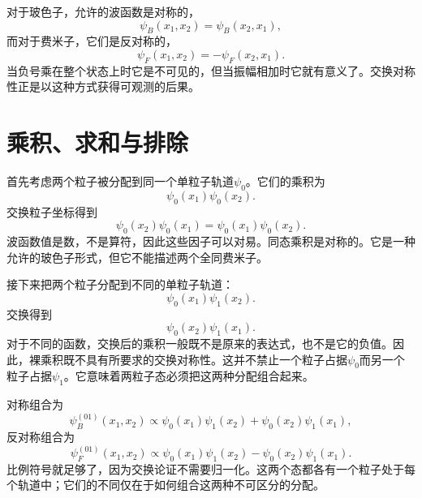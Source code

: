 
对于玻色子，允许的波函数是对称的，
\begin{equation}
\psi_B(x_1,x_2)=\psi_B(x_2,x_1),
\end{equation}
而对于费米子，它们是反对称的，
\begin{equation}
\psi_F(x_1,x_2)=-\psi_F(x_2,x_1).
\end{equation}
当负号乘在整个状态上时它是不可见的，但当振幅相加时它就有意义了。交换对称性正是以这种方式获得可观测的后果。

\section{乘积、求和与排除}

首先考虑两个粒子被分配到同一个单粒子轨道\(\psi_0\)。它们的乘积为
\begin{equation}
\psi_0(x_1)\psi_0(x_2).
\end{equation}
交换粒子坐标得到
\begin{equation}
\psi_0(x_2)\psi_0(x_1)
=
\psi_0(x_1)\psi_0(x_2).
\end{equation}
波函数值是数，不是算符，因此这些因子可以对易。同态乘积是对称的。它是一种允许的玻色子形式，但它不能描述两个全同费米子。

接下来把两个粒子分配到不同的单粒子轨道：
\begin{equation}
\psi_0(x_1)\psi_1(x_2).
\end{equation}
交换得到
\begin{equation}
\psi_0(x_2)\psi_1(x_1).
\end{equation}
对于不同的函数，交换后的乘积一般既不是原来的表达式，也不是它的负值。因此，裸乘积既不具有所要求的交换对称性。这并不禁止一个粒子占据\(\psi_0\)而另一个粒子占据\(\psi_1\)。它意味着两粒子态必须把这两种分配组合起来。

对称组合为
\begin{equation}
\psi_B^{(01)}(x_1,x_2)
\propto
\psi_0(x_1)\psi_1(x_2)
+
\psi_0(x_2)\psi_1(x_1),
\end{equation}
反对称组合为
\begin{equation}
\psi_F^{(01)}(x_1,x_2)
\propto
\psi_0(x_1)\psi_1(x_2)
-
\psi_0(x_2)\psi_1(x_1).
\end{equation}
比例符号就足够了，因为交换论证不需要归一化。这两个态都各有一个粒子处于每个轨道中；它们的不同仅在于如何组合这两种不可区分的分配。

